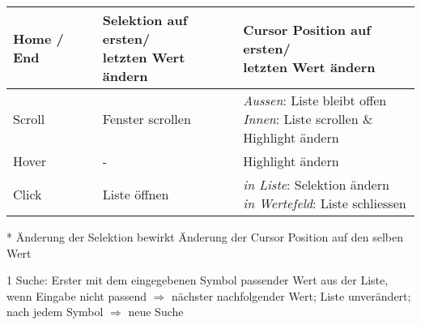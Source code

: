 \begin{table}[!htb]
\begin{adjustbox}{max width=\textwidth}
\begin{threeparttable}
\begin{tabular}{ l || l | l }
                \hline
                Home / End & \tbbr{Selektion auf ersten/ \\ 
                                   letzten Wert ändern}   & \tbbr{Cursor Position auf ersten/ \\ 
                                                                  letzten Wert ändern}                   \\
                \hline \hline
                Scroll     & Fenster scrollen             & \tbbr{\emph{Aussen}: Liste bleibt offen \\
                                                                  \emph{Innen}: Liste scrollen \& \\ 
                                                                                Highlight ändern}        \\
                \hline
                Hover      & -                            & Highlight ändern                             \\
                \hline
                Click      & Liste öffnen                 & \tbbr{\emph{in Liste}: Selektion ändern \\
                                                                  \emph{in Wertefeld}: Liste schliessen} \\
                \hline
            \end{tabular}
            \begin{tablenotes}
                \scriptsize
                \item[*] Änderung der Selektion bewirkt Änderung der Cursor Position auf den selben Wert
                \item
                \item[1] Suche: Erster mit dem eingegebenen Symbol passender Wert aus der Liste, wenn Eingabe nicht passend $\Rightarrow$ nächster nachfolgender Wert; 
                                Liste unverändert; nach jedem Symbol $\Rightarrow$ neue Suche
            \end{tablenotes}
        \end{threeparttable}
    \end{adjustbox}
\end{table}
